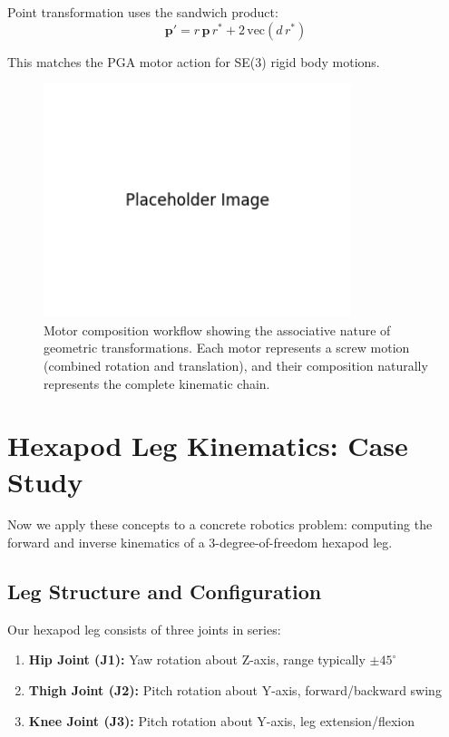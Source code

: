 \documentclass[11pt]{article}
\begin{document}
Point transformation uses the sandwich product:
\[\mathbf{p}' = r\,\mathbf{p}\,r^* + 2\,\mathrm{vec}(d\,r^*)\]

This matches the PGA motor action for SE(3) rigid body motions.

\begin{figure}[H]
    \centering
    \includegraphics[width=0.8\textwidth]{illustrations/motor_composition.png}
    \caption{Motor composition workflow showing the associative nature of geometric transformations. Each motor represents a screw motion (combined rotation and translation), and their composition naturally represents the complete kinematic chain.}
    \label{fig:motor_composition}
\end{figure}

\section{Hexapod Leg Kinematics: Case Study}

Now we apply these concepts to a concrete robotics problem: computing the forward and inverse kinematics of a 3-degree-of-freedom hexapod leg.

\subsection{Leg Structure and Configuration}

Our hexapod leg consists of three joints in series:
\begin{enumerate}
    \item \textbf{Hip Joint (J1):} Yaw rotation about Z-axis, range typically $\pm 45^\circ$
    \item \textbf{Thigh Joint (J2):} Pitch rotation about Y-axis, forward/backward swing
    \item \textbf{Knee Joint (J3):} Pitch rotation about Y-axis, leg extension/flexion
\end{enumerate}
\end{document}
